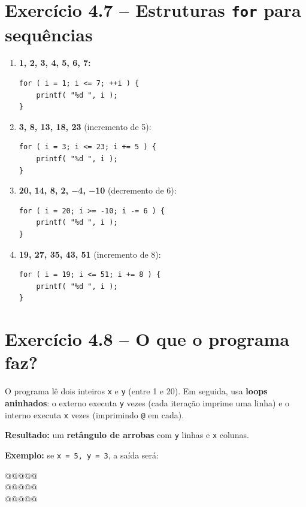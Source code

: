 \documentclass[12pt,a4paper]{article}
\begin{document}
\section{Exercício 4.7 -- Estruturas \texttt{for} para sequências}

\begin{respostabox}
\begin{enumerate}[label=\textbf{\alph*)}]

\item \textbf{1, 2, 3, 4, 5, 6, 7:}
\begin{lstlisting}
for ( i = 1; i <= 7; ++i ) {
    printf( "%d ", i );
}
\end{lstlisting}

\item \textbf{3, 8, 13, 18, 23} (incremento de 5):
\begin{lstlisting}
for ( i = 3; i <= 23; i += 5 ) {
    printf( "%d ", i );
}
\end{lstlisting}

\item \textbf{20, 14, 8, 2, $-$4, $-$10} (decremento de 6):
\begin{lstlisting}
for ( i = 20; i >= -10; i -= 6 ) {
    printf( "%d ", i );
}
\end{lstlisting}

\item \textbf{19, 27, 35, 43, 51} (incremento de 8):
\begin{lstlisting}
for ( i = 19; i <= 51; i += 8 ) {
    printf( "%d ", i );
}
\end{lstlisting}

\end{enumerate}
\end{respostabox}

\section{Exercício 4.8 -- O que o programa faz?}

\begin{respostabox}
O programa lê dois inteiros \texttt{x} e \texttt{y} (entre 1 e 20). Em seguida, usa
\textbf{loops aninhados}: o externo executa \texttt{y} vezes (cada iteração imprime
uma linha) e o interno executa \texttt{x} vezes (imprimindo \texttt{@} em cada).

\textbf{Resultado:} um \textbf{retângulo de arrobas} com \texttt{y} linhas e
\texttt{x} colunas.

\textbf{Exemplo:} se \texttt{x = 5, y = 3}, a saída será:

\begin{saida}
@@@@@\\
@@@@@\\
@@@@@
\end{saida}
\end{respostabox}
\end{document}
